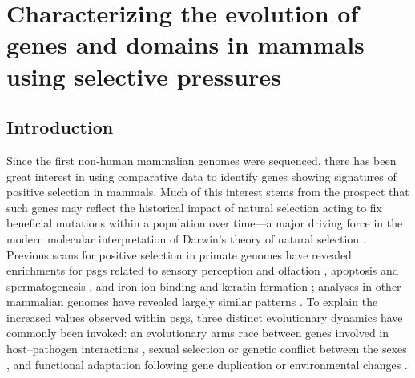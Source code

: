 \chapter{Characterizing the evolution of genes and domains in mammals using \sw selective pressures}
\acresetall
\label{ch_mammals2}
\section{Introduction}

Since the first non-human mammalian genomes were sequenced, there has
been great interest in using comparative data to identify genes
showing signatures of positive selection in mammals. Much of this
interest stems from the prospect that such genes may reflect the
historical impact of natural selection acting to fix beneficial
mutations within a population over time---a major driving force in the
modern molecular interpretation of Darwin's theory of natural
selection \citep{Endo1996,Hughes1999}. Previous scans for positive
selection in primate genomes have revealed enrichments for \acp{psg}
related to sensory perception and olfaction \citep{Clark2003},
apoptosis and spermatogenesis \citep{Nielsen2005}, and iron ion
binding and keratin formation \citep{Macaque2007}; analyses in other
mammalian genomes have revealed largely similar patterns
\citep{Kosiol2008,Li2009a}. To explain the increased \dnds values
observed within \acp{psg}, three distinct evolutionary dynamics have
commonly been invoked: an evolutionary arms race between genes
involved in host--pathogen interactions
\citep{Yang2005c,Meyerson2011}, sexual selection or genetic conflict
between the sexes \citep{Wyckoff2000,Clark2000}, and functional
adaptation following gene duplication or environmental changes
\citep{Zhang2002}.

